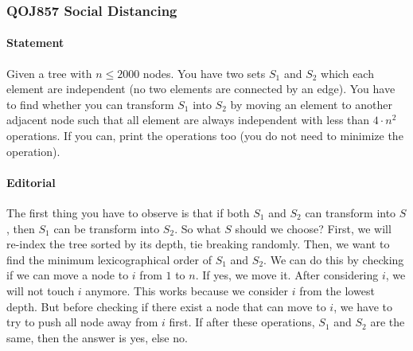 \subsubsection{QOJ857 Social Distancing}


\paragraph{Statement}
Given a tree with $n \le 2000$ nodes.
You have two sets $S_1$ and $S_2$ which each element are independent (no two elements are connected by an edge).
You have to find whether you can transform $S_1$ into $S_2$ by moving an element to another adjacent node such that all element are always independent with less than $4 \cdot n^2$ operations.
If you can, print the operations too (you do not need to minimize the operation).

\paragraph{Editorial}
The first thing you have to observe is that if both $S_1$ and $S_2$ can transform into $S$, then $S_1$ can be transform into $S_2$.
So what $S$ should we choose?
First, we will re-index the tree sorted by its depth, tie breaking randomly.
Then, we want to find the minimum lexicographical order of $S_1$ and $S_2$.
We can do this by checking if we can move a node to $i$ from $1$ to $n$.
If yes, we move it.
After considering $i$, we will not touch $i$ anymore.
This works because we consider $i$ from the lowest depth.
But before checking if there exist a node that can move to $i$, we have to try to push all node away from $i$ first.
If after these operations, $S_1$ and $S_2$ are the same, then the answer is yes, else no.

